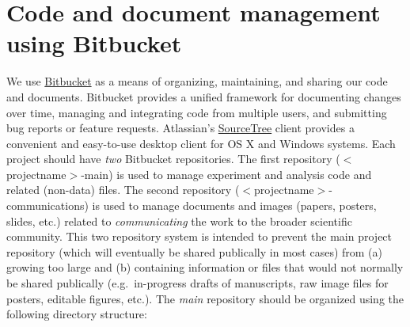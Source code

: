 \documentclass{tufte-book} %
\begin{document}
 \section{Code and document management using Bitbucket}\label{sec:bitbucket}
 We use \href{https://www.bitbucket.org/}{Bitbucket} as a means of organizing, maintaining, and sharing
 our code and documents.  Bitbucket provides a unified framework for
 documenting changes over time, managing and integrating code from
 multiple users, and submitting bug reports or feature requests. 
Atlassian's
 \href{https://www.atlassian.com/software/sourcetree/overview?_mid=1ba3573dadf246f44f2a97bc50bfd72e&gclid=Cj0KEQiA4OqnBRDAj9aazvPji9ABEiQANq28oBGvgRhznXBb_RDL6QRe0IM7vvEUXFkRDoWBSbpmsmAaAkCE8P8HAQ}{SourceTree}
 client provides a convenient and easy-to-use desktop client for OS X
 and Windows systems.  Each project should have \textit{two} Bitbucket
 repositories.  The first repository ($<$projectname$>$-main) is used to
 manage experiment and analysis code and related (non-data) files.
 The second repository ($<$projectname$>$-communications) is used to
 manage documents and images (papers, posters, slides, etc.) related
 to \textit{communicating} the work to the broader scientific
 community.  This two repository system is intended to prevent the main project
 repository (which will eventually be shared publically in most cases)
 from (a) growing too large and (b) containing information or files
 that would not normally be shared publically (e.g.\ in-progress
 drafts of manuscripts, raw image files for posters, editable figures,
 etc.).  The \textit{main} repository should be organized using the following directory structure:
\end{document}
